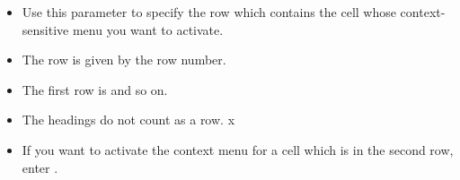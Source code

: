  \begin{itemize}
\item Use this parameter to specify the row which contains the cell whose context-sensitive menu you want to activate.
\item The row is given by the row number.
\item The first row is  and so on.
\item The headings do not count as a row. 
x\item If you want to activate the context menu for  a cell which is in the second row, enter . 
\end{itemize}  